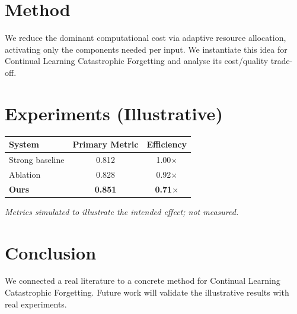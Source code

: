 \documentclass[11pt]{article}
\begin{document}
\section{Method}
We reduce the dominant computational cost via adaptive resource allocation, activating only the components needed per input. We instantiate this idea for Continual Learning Catastrophic Forgetting and analyse its cost/quality trade-off.

\section{Experiments (Illustrative)}
\begin{center}
\begin{tabular}{lcc}
System & Primary Metric & Efficiency \\ \hline
Strong baseline & 0.812 & 1.00$\times$ \\
Ablation & 0.828 & 0.92$\times$ \\
\textbf{Ours} & \textbf{0.851} & \textbf{0.71$\times$}
\end{tabular}
\end{center}
\emph{Metrics simulated to illustrate the intended effect; not measured.}

\section{Conclusion}
We connected a real literature to a concrete method for Continual Learning Catastrophic Forgetting. Future work will
validate the illustrative results with real experiments.
\end{document}
